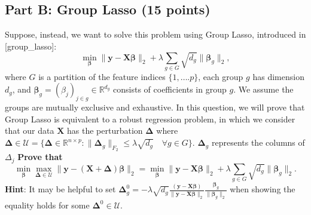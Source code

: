 \documentclass{article}%
\renewcommand{\cite}[1]{[#1]}
\begin{document}
\subsection*{Part B: Group Lasso (15 points)}
Suppose, instead, we want to solve this problem using Group Lasso, introduced in \cite{group_lasso}: 
\begin{equation}
    \min_{\boldsymbol{\beta}} \| \mathbf{y} - \mathbf{X} \boldsymbol{\beta} \|_2 + \lambda \sum_{g \in G} \sqrt{d_g} \| \boldsymbol{\beta}_g \|_2,
\end{equation}
where $G$ is a partition of the feature indices $\{1,\hdots. p\}$,  each group $g$ has dimension $d_g$, and $\boldsymbol{\beta}_g = (\beta_j)_{j \in g} \in \mathbb{R}^{d_g}$ consists of coefficients in group $g$. We assume the groups are mutually exclusive and exhaustive.
In this question, we will prove that Group Lasso is equivalent to a robust regression problem, in which we consider that our data $\mathbf{X}$ has the perturbation $\mathbf{\Delta}$ where $\mathbf{\Delta} \in \mathcal{U}  = \{\mathbf{\Delta} \in \mathbb{R}^{n \times p}: \| \mathbf{\Delta}_g \| _{F_2} \leq \lambda \sqrt{d_g} \quad \forall g \in G \} $. 
$\mathbf{\Delta}_g$ represents the columns of $\Delta_j $
\textbf{Prove that}
\begin{equation}
    \min_{\boldsymbol{\beta}} \max_{ \mathbf{\Delta} \in \mathcal{U}} 
    \| \mathbf{y} - (\mathbf{X} + \mathbf{\Delta} )\boldsymbol{\beta} \|_2 = 
    \min_{\boldsymbol{\beta}} \| \mathbf{y} - \mathbf{X} \boldsymbol{\beta} \|_2 + \lambda \sum_{g \in G} \sqrt{d_g} \| \boldsymbol{\beta}_g \|_2.
\end{equation}
\textbf{Hint}: It may be helpful to set $\mathbf{\Delta}_g^0 = -\lambda \sqrt{d_g} \frac{(\mathbf{y} - \mathbf{X}\boldsymbol{\beta} )}{\|\mathbf{y} - \mathbf{X}\boldsymbol{\beta} \|_2} \frac{\boldsymbol{\beta}_g}{\|\boldsymbol{\beta}_g\|_2}$ when showing the equality holds for some $\mathbf{\Delta}^0 \in \mathcal{U}$.
\end{document}
